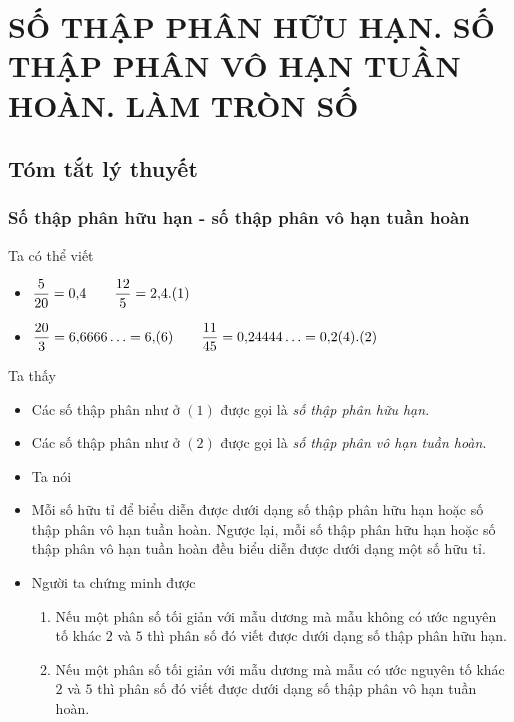 \section{SỐ THẬP PHÂN HỮU HẠN. SỐ THẬP PHÂN VÔ HẠN TUẦN HOÀN. LÀM TRÒN SỐ}
\subsection{Tóm tắt lý thuyết}
\subsubsection{Số thập phân hữu hạn - số thập phân vô hạn tuần hoàn}
Ta có thể viết
\begin{itemize}
	\item $ \dfrac{5}{20}=0{,}4 \qquad \dfrac{12}{5}=2{,}4. \hfill(1) $
	\item $ \dfrac{20}{3}=6{,}6666\ldots=6{,}(6) \qquad \dfrac{11}{45}=0{,}24444\ldots=0{,}2(4). \hfill(2) $
\end{itemize}
\begin{nx}
Ta thấy
\begin{itemize}
	\item Các số thập phân như ở $ (1) $ được gọi là \textit{số thập phân hữu hạn}.
	\item Các số thập phân như ở $ (2) $ được gọi là \textit{số thập phân vô hạn tuần hoàn}.
	\item Ta nói
    \item Mỗi số hữu tỉ để biểu diễn được dưới dạng số thập phân hữu hạn hoặc số thập phân vô hạn tuần hoàn. Ngược lại, mỗi số thập phân hữu hạn hoặc số thập phân vô hạn tuần hoàn đều biểu diễn được dưới dạng một số hữu tỉ.
    \item Người ta chứng minh được
    \begin{enumerate}
    	\item Nếu một phân số tối giản với mẫu dương mà mẫu không có ước nguyên tố khác $ 2 $ và $ 5 $ thì phân số đó viết được dưới dạng số thập phân hữu hạn.
    	\item Nếu một phân số tối giản với mẫu dương mà mẫu có ước nguyên tố khác $ 2 $ và $ 5 $ thì phân số đó viết được dưới dạng số thập phân vô hạn tuần hoàn.
    \end{enumerate} 
\end{itemize}
\end{nx}

